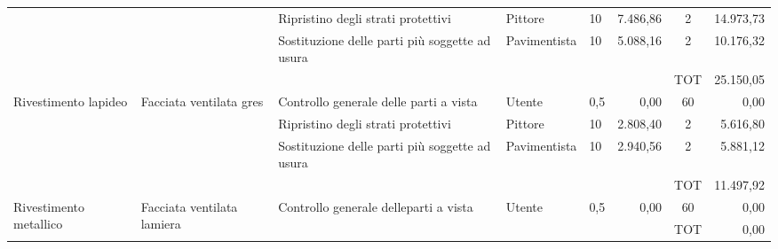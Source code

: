 \begin{landscape}
\begin{table}[p]
\begin{tabular}{@{}lllllrcr@{}}
 &  & Ripristino degli strati protettivi & Pittore & 10 &   7.486,86 & 2 &   14.973,73 \\
 &  & Sostituzione delle parti più soggette ad usura & Pavimentista & 10 &   5.088,16 & 2 &   10.176,32 \\
 &  &  &  &  &  & TOT &   25.150,05 \\ \midrule
\multirow{4}{*}{Rivestimento lapideo} & \multirow{4}{*}{Facciata ventilata gres} & Controllo generale delle parti a vista & Utente & 0,5 &   0,00 & 60 &   0,00 \\
 &  & Ripristino degli strati protettivi & Pittore & 10 &   2.808,40 & 2 &   5.616,80 \\
 &  & Sostituzione delle parti più soggette ad usura & Pavimentista & 10 &   2.940,56 & 2 &   5.881,12 \\
 &  &  &  &  &  & TOT &   11.497,92 \\\midrule
\multirow{2}{*}{Rivestimento metallico} & \multirow{2}{*}{Facciata ventilata lamiera} & Controllo generale delleparti a vista & Utente & 0,5 &   0,00 & 60 &   0,00 \\
 &  &  &  &  &  & TOT &   0,00 \\ \bottomrule
\end{tabular}
\end{table}
\end{landscape}